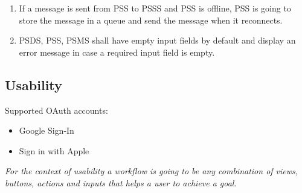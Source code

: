 \pagebreak
\begin{enumerate}[resume, label=ROB-\arabic*]
    \item If a message is sent from PSS to PSSS and PSS is offline, PSS is 
    going to store the message in a queue and send the message 
    when it reconnects.
    \item PSDS, PSS, PSMS shall have empty input fields by default and display 
    an error message in case a required input field is empty.
\end{enumerate}

\subsection{Usability}
Supported OAuth accounts: 
\begin{itemize}
    \item Google Sign-In
    \item Sign in with Apple
\end{itemize}
 
\noindent \textit{For the context of usability a workflow is going to be any 
combination of views, buttons, actions and inputs that helps a user 
to achieve a goal}.

